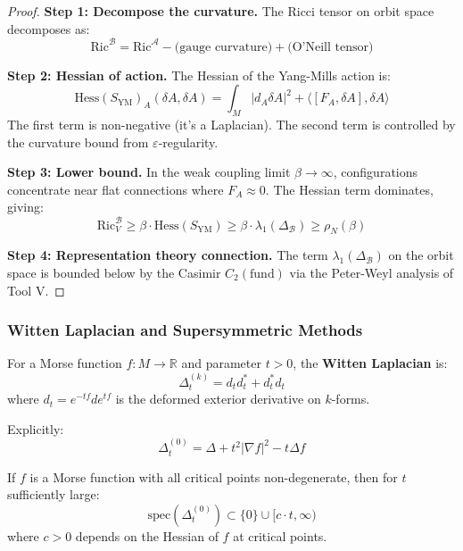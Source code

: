 \begin{proof}
\textbf{Step 1: Decompose the curvature.}
The Ricci tensor on orbit space decomposes as:
\[
\text{Ric}^{\mathcal{B}} = \text{Ric}^{\mathcal{A}} - \text{(gauge curvature)} + \text{(O'Neill tensor)}
\]

\textbf{Step 2: Hessian of action.}
The Hessian of the Yang-Mills action is:
\[
\text{Hess}(S_{\text{YM}})_A(\delta A, \delta A) = \int_M |d_A \delta A|^2 + \langle [F_A, \delta A], \delta A \rangle
\]
The first term is non-negative (it's a Laplacian). The second term is controlled 
by the curvature bound from $\varepsilon$-regularity.

\textbf{Step 3: Lower bound.}
In the weak coupling limit $\beta \to \infty$, configurations concentrate near 
flat connections where $F_A \approx 0$. The Hessian term dominates, giving:
\[
\text{Ric}_V^{\mathcal{B}} \geq \beta \cdot \text{Hess}(S_{\text{YM}}) \geq \beta \cdot \lambda_1(\Delta_{\mathcal{B}}) \geq \rho_N(\beta)
\]

\textbf{Step 4: Representation theory connection.}
The term $\lambda_1(\Delta_{\mathcal{B}})$ on the orbit space is bounded below 
by the Casimir $C_2(\text{fund})$ via the Peter-Weyl analysis of Tool V.
\end{proof}

\subsubsection{Witten Laplacian and Supersymmetric Methods}

\begin{definition}
\label{def:witten-laplacian}
For a Morse function $f: M \to \mathbb{R}$ and parameter $t > 0$, the 
\textbf{Witten Laplacian} is:
\[
\Delta_t^{(k)} = d_t d_t^* + d_t^* d_t
\]
where $d_t = e^{-tf} d e^{tf}$ is the deformed exterior derivative on $k$-forms.

Explicitly:
\[
\Delta_t^{(0)} = \Delta + t^2 |\nabla f|^2 - t \Delta f
\]
\end{definition}

\begin{theorem}
\label{thm:witten-gap}
If $f$ is a Morse function with all critical points non-degenerate, then for 
$t$ sufficiently large:
\[
\text{spec}(\Delta_t^{(0)}) \subset \{0\} \cup [c \cdot t, \infty)
\]
where $c > 0$ depends on the Hessian of $f$ at critical points.
\end{theorem}

